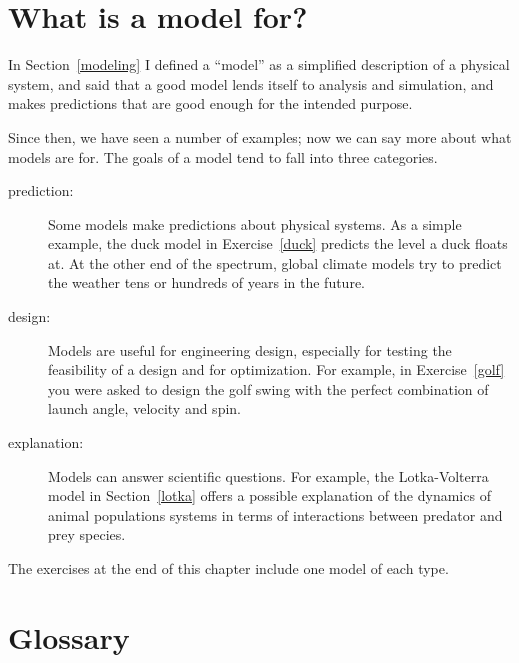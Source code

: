 \documentclass{book}
\begin{document}

\section{What is a model for?}

In Section~\ref{modeling} I defined a ``model'' as a simplified
description of a physical system, and said that a good model
lends itself to analysis and simulation, and makes predictions
that are good enough for the intended purpose.

Since then, we have seen a number of examples; now we can
say more about what models are for. The goals of a model tend
to fall into three categories.
 
\begin{description}

\item[prediction:] Some models make predictions about physical
systems. As a simple example, the duck model in
Exercise~\ref{duck} predicts the level a duck floats at. At the other
end of the spectrum, global climate models try to predict the weather
tens or hundreds of years in the future.

\item[design:] Models are useful for engineering design, especially
for testing the feasibility of a design and for optimization. For
example, in Exercise~\ref{golf} you were asked to design the golf
swing with the perfect combination of launch angle, velocity and spin.

\item[explanation:] Models can answer scientific questions. For
example, the Lotka-Volterra model in Section~\ref{lotka} offers a
possible explanation of the dynamics of animal populations systems in
terms of interactions between predator and prey species. 

\end{description}

The exercises at the end of this chapter include one model of
each type.


\section{Glossary}
\end{document}
